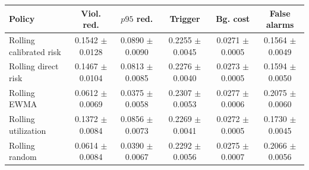 \begin{tabular}{lccccc}
\hline
Policy & Viol. red. & $p95$ red. & Trigger & Bg. cost & False alarms \\
\hline
Rolling calibrated risk & 0.1542 $\pm$ 0.0128 & 0.0890 $\pm$ 0.0090 & 0.2255 $\pm$ 0.0045 & 0.0271 $\pm$ 0.0005 & 0.1564 $\pm$ 0.0049 \\
Rolling direct risk & 0.1467 $\pm$ 0.0104 & 0.0813 $\pm$ 0.0085 & 0.2276 $\pm$ 0.0040 & 0.0273 $\pm$ 0.0005 & 0.1594 $\pm$ 0.0050 \\
Rolling EWMA & 0.0612 $\pm$ 0.0069 & 0.0375 $\pm$ 0.0058 & 0.2307 $\pm$ 0.0053 & 0.0277 $\pm$ 0.0006 & 0.2075 $\pm$ 0.0060 \\
Rolling utilization & 0.1372 $\pm$ 0.0084 & 0.0856 $\pm$ 0.0073 & 0.2269 $\pm$ 0.0041 & 0.0272 $\pm$ 0.0005 & 0.1730 $\pm$ 0.0045 \\
Rolling random & 0.0614 $\pm$ 0.0084 & 0.0390 $\pm$ 0.0067 & 0.2292 $\pm$ 0.0056 & 0.0275 $\pm$ 0.0007 & 0.2066 $\pm$ 0.0056 \\
\hline
\end{tabular}
